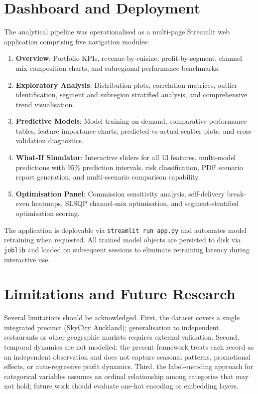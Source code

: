\documentclass[10pt,a4paper,twocolumn]{article}
\begin{document}
\section{Dashboard and Deployment}
\label{sec:dashboard}

The analytical pipeline was operationalised as a multi-page Streamlit web application
comprising five navigation modules:

\begin{enumerate}[leftmargin=*, itemsep=1pt]
  \item \textbf{Overview}: Portfolio KPIs, revenue-by-cuisine, profit-by-segment, channel
        mix composition charts, and subregional performance benchmarks.
  \item \textbf{Exploratory Analysis}: Distribution plots, correlation matrices, outlier
        identification, segment and subregion stratified analysis, and comprehensive
        trend visualisation.
  \item \textbf{Predictive Models}: Model training on demand, comparative performance
        tables, feature importance charts, predicted-vs-actual scatter plots, and
        cross-validation diagnostics.
  \item \textbf{What-If Simulator}: Interactive sliders for all 13 features, multi-model
        predictions with 95\% prediction intervals, risk classification, PDF scenario
        report generation, and multi-scenario comparison capability.
  \item \textbf{Optimisation Panel}: Commission sensitivity analysis, self-delivery
        break-even heatmaps, SLSQP channel-mix optimisation, and segment-stratified
        optimisation scoring.
\end{enumerate}

The application is deployable via \texttt{streamlit run app.py} and automates model
retraining when requested. All trained model objects are persisted to disk via
\texttt{joblib} and loaded on subsequent sessions to eliminate retraining latency
during interactive use.

\section{Limitations and Future Research}
\label{sec:limitations}

Several limitations should be acknowledged. First, the dataset covers a single
integrated precinct (SkyCity Auckland); generalisation to independent restaurants or
other geographic markets requires external validation. Second, temporal dynamics are
not modelled: the present framework treats each record as an independent observation
and does not capture seasonal patterns, promotional effects, or auto-regressive profit
dynamics. Third, the label-encoding approach for categorical variables assumes an
ordinal relationship among categories that may not hold; future work should evaluate
one-hot encoding or embedding layers.
\end{document}
